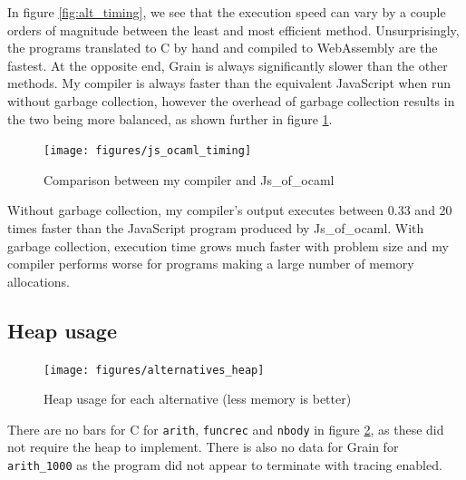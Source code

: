 In figure \ref{fig:alt_timing}, we see that the execution speed can vary by a couple orders of magnitude between the least and most efficient method. Unsurprisingly, the programs translated to C by hand and compiled to WebAssembly are the fastest. At the opposite end, Grain is always significantly slower than the other methods. My compiler is always faster than the equivalent JavaScript when run without garbage collection, however the overhead of garbage collection results in the two being more balanced, as shown further in figure \ref{fig:js_oc_timing}.%


\begin{figure}[H]
\hspace{-1.6cm}
\texttt{[image: figures/js\_ocaml\_timing]}
\vspace{-0.5cm}
\caption{Comparison between my compiler and Js\_of\_ocaml}
 \label{fig:js_oc_timing} 
\end{figure}

Without garbage collection, my compiler's output	executes between 0.33 and 20 times faster than the JavaScript program produced by  Js\_of\_ocaml. With garbage collection, execution time grows much faster with problem size and my compiler performs worse for programs making a large number of memory allocations.



\subsection{Heap usage}

\begin{figure}[H]
\hspace{-1cm}
\texttt{[image: figures/alternatives\_heap]}
\vspace{-0.5cm}
\caption{Heap usage for each alternative (less memory is better)}
 \label{fig:alt_heap} 
\end{figure}

There are no bars for C for \verb|arith|, \verb|funcrec| and \verb|nbody| in figure \ref{fig:alt_heap}, as these did not require the heap to implement. 
There is also no data for Grain for \verb|arith_1000| as the program did not appear to terminate with tracing enabled.


